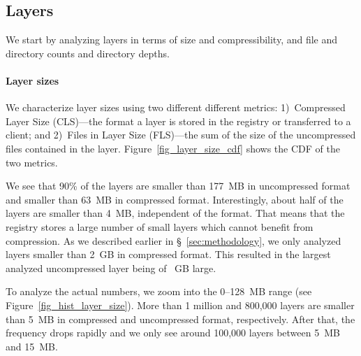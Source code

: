 \subsection{Layers}
\label{sec:layers}

We start by analyzing layers in terms of size and compressibility, and file and directory
counts and directory depths.




\paragraph{Layer sizes}
%
We characterize layer sizes using two different different metrics:
%
1)~Compressed Layer Size (CLS)---the format a layer is stored in the registry or
transferred to a client;
%
%
and 2)~Files in Layer Size (FLS)---the sum of the size of the uncompressed files contained
in the layer.
%
Figure~\ref{fig_layer_size_cdf} shows the CDF of the two metrics.


We see that 90\% of the layers are smaller than 177~MB in uncompressed 
format and smaller than 63~MB in compressed format.
%
Interestingly, about half of the layers are smaller than 4~MB, independent
of the format. That means that the registry stores a large number of
small layers which cannot benefit from compression.
%
As we described earlier in \S~\ref{sec:methodology}, we only
analyzed layers smaller than 2~GB in compressed format. This
resulted in the largest analyzed uncompressed layer being
of \gap~GB large.
%

To analyze the actual numbers, we zoom into the 0--128~MB range
(see Figure~\ref{fig_hist_layer_size}).
%
More than 1 million and 800,000 layers are smaller than 5~MB
in compressed and uncompressed format, respectively. After that,
the frequency drops rapidly and we only see around 100,000 layers
between 5~MB and 15~MB.




